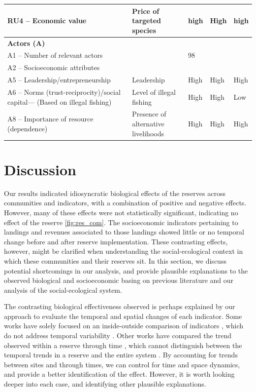 \documentclass{frontiersSCNS}
\theoremstyle{definition}
\theoremstyle{definition}
\theoremstyle{definition}
\theoremstyle{remark}
\begin{document}
\begin{table}
\begin{tabular}[t]{>{\raggedright\arraybackslash}p{10em}|>{\raggedright\arraybackslash}p{10em}|l|l|l}
\hline
RU4 – Economic value & Price of targeted species & high & High & high\\
\hline
\textbf{Actors (A)} & \textbf{} & \textbf{} & \textbf{}\\
\hline
A1 – Number of relevant actors &  & 98 &  & \\
\hline
A2 – Socioeconomic attributes &  &  &  & \\
\hline
A5 – Leadership/entrepreneurship & Leadership & High & High & High\\
\hline
A6 – Norms (trust-reciprocity)/social capital--- (Based on illegal fishing) & Level of illegal fishing & High & High & Low\\
\hline
A8 – Importance of resource (dependence) & Presence of alternative livelihoods & High & High & High\\
\hline
\end{tabular}
\end{table}

\clearpage

\section{Discussion}\label{discussion}

Our results indicated idiosyncratic biological effects of the reserves
across communities and indicators, with a combination of positive and
negative effects. However, many of these effects were not statistically
significant, indicating no effect of the reserve \ref{fig:res_com}. The
socioeconomic indicators pertaining to landings and revenues associated
to those landings showed little or no temporal change before and after
reserve implementation. These contrasting effects, however, might be
clarified when understanding the social-ecological context in which
these communities and their reserves sit. In this section, we discuss
potential shortcomings in our analysis, and provide plausible
explanations to the observed biological and socioeconomic basing on
previous literature and our analysis of the social-ecological system.

The contrasting biological effectiveness observed is perhaps explained
by our approach to evaluate the temporal and spatial changes of each
indicator. Some works have solely focused on an inside-outside
comparison of indicators
\citep{guidetti_2014-8Z,friedlander_2017-oI,rodriguez_2017-PD}, which do
not address temporal variability \citep{depalma_2018}. Other works have
compared the trend observed within a reserve through time
\citep{betti_2017-lq}, which cannot distinguish between the temporal
trends in a reserve and the entire system \citep{depalma_2018}. By
accounting for trends between sites and through times, we can control
for time and space dynamics, and provide a better identification of the
effect. However, it is worth looking deeper into each case, and
identifying other plausible explanations.
\end{document}
